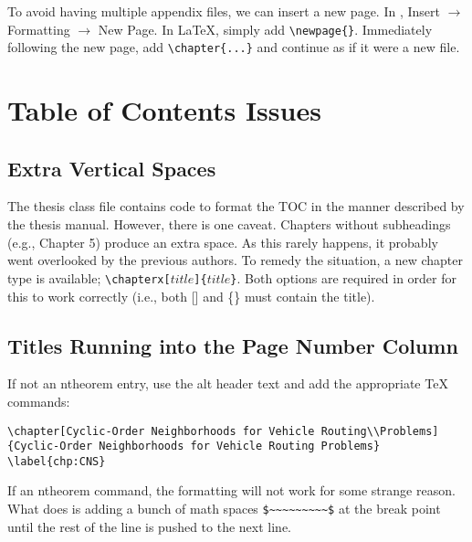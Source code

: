 
\appendix \label{sec:Appendix}


To avoid having multiple appendix files, we can insert a new page.
In \LyX{}, Insert $\rightarrow$ Formatting $\rightarrow$ New Page.
In \LaTeX{}, simply add \texttt{\textbackslash{}newpage\{\}}. Immediately
following the new page, add \texttt{\textbackslash{}chapter\{...\}}
and continue as if it were a new file.

\newpage{}

\chapter{Table of Contents Issues}


\section{Extra Vertical Spaces}

The thesis class file contains code to format the TOC in the manner
described by the thesis manual. However, there is one caveat. Chapters
without subheadings (e.g., Chapter 5) produce an extra space. As this
rarely happens, it probably went overlooked by the previous authors.
To remedy the situation, a new chapter type is available; \texttt{\textbackslash{}chapterx{[}$title${]}\{$title$\}}.
Both options are required in order for this to work correctly (i.e.,
both {[}{]} and \{\} must contain the title).


\section{Titles Running into the Page Number Column}

If not an ntheorem entry, use the alt header text and add the appropriate
\TeX{} commands:

\noindent \texttt{\textbackslash{}chapter{[}Cyclic-Order Neighborhoods
for Vehicle Routing\textbackslash{}\textbackslash{}Problems{]}\{Cyclic-Order
Neighborhoods for Vehicle Routing Problems\} \textbackslash{}label\{chp:CNS\}}

If an ntheorem command, the formatting will not work for some strange
reason. What does is adding a bunch of math spaces \texttt{\$\textasciitilde{}\textasciitilde{}\textasciitilde{}\textasciitilde{}\textasciitilde{}\textasciitilde{}\textasciitilde{}\textasciitilde{}\textasciitilde{}\$}
at the break point until the rest of the line is pushed to the next
line.

